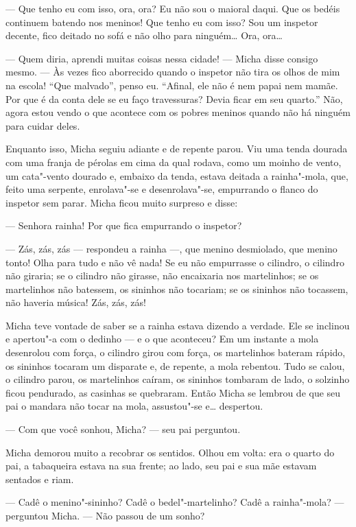 --- Que tenho eu com isso, ora, ora? Eu não sou o maioral daqui. Que os
bedéis continuem batendo nos meninos! Que tenho eu com isso? Sou um
inspetor decente, fico deitado no sofá e não olho para ninguém\ldots{} Ora,
ora\ldots{}

--- Quem diria, aprendi muitas coisas nessa cidade! --- Micha disse
consigo mesmo. --- Às vezes fico aborrecido quando o inspetor não tira
os olhos de mim na escola! ``Que malvado'', penso eu. ``Afinal, ele não
é nem papai nem mamãe. Por que é da conta dele se eu faço travessuras?
Devia ficar em seu quarto.'' Não, agora estou vendo o que acontece com
os pobres meninos quando não há ninguém para cuidar deles.

Enquanto isso, Micha seguiu adiante e de repente parou. Viu uma tenda
dourada com uma franja de pérolas em cima da qual rodava, como um moinho
de vento, um cata"-vento dourado e, embaixo da tenda, estava deitada a
rainha"-mola, que, feito uma serpente, enrolava"-se e desenrolava"-se,
empurrando o flanco do inspetor sem parar. Micha ficou muito surpreso e
disse:

--- Senhora rainha! Por que fica empurrando o inspetor?

--- Zás, zás, zás --- respondeu a rainha ---, que menino desmiolado, que
menino tonto! Olha para tudo e não vê nada! Se eu não empurrasse o
cilindro, o cilindro não giraria; se o cilindro não girasse, não
encaixaria nos martelinhos; se os martelinhos não batessem, os sininhos
não tocariam; se os sininhos não tocassem, não haveria música! Zás, zás,
zás!

Micha teve vontade de saber se a rainha estava dizendo a verdade. Ele se
inclinou e apertou"-a com o dedinho --- e o que aconteceu? Em um instante
a mola desenrolou com força, o cilindro girou com força, os martelinhos
bateram rápido, os sininhos tocaram um disparate e, de repente, a mola
rebentou. Tudo se calou, o cilindro parou, os martelinhos caíram, os
sininhos tombaram de lado, o solzinho ficou pendurado, as casinhas se
quebraram. Então Micha se lembrou de que seu pai o mandara não tocar na
mola, assustou"-se e\ldots{} despertou.

--- Com que você sonhou, Micha? --- seu pai perguntou.

Micha demorou muito a recobrar os sentidos. Olhou em volta: era o quarto
do pai, a tabaqueira estava na sua frente; ao lado, seu pai e sua mãe
estavam sentados e riam.

--- Cadê o menino"-sininho? Cadê o bedel"-martelinho? Cadê a rainha"-mola?
--- perguntou Micha. --- Não passou de um sonho?


